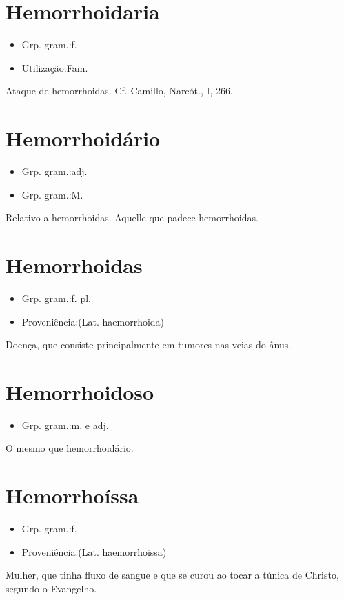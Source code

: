 \documentclass{article}
\begin{document}
\section{Hemorrhoidaria}
\begin{itemize}
\item {Grp. gram.:f.}
\end{itemize}
\begin{itemize}
\item {Utilização:Fam.}
\end{itemize}
Ataque de hemorrhoidas. Cf. Camillo, \textunderscore Narcót.\textunderscore , I, 266.
\section{Hemorrhoidário}
\begin{itemize}
\item {Grp. gram.:adj.}
\end{itemize}
\begin{itemize}
\item {Grp. gram.:M.}
\end{itemize}
Relativo a hemorrhoidas.
Aquelle que padece hemorrhoidas.
\section{Hemorrhoidas}
\begin{itemize}
\item {Grp. gram.:f. pl.}
\end{itemize}
\begin{itemize}
\item {Proveniência:(Lat. \textunderscore haemorrhoida\textunderscore )}
\end{itemize}
Doença, que consiste principalmente em tumores nas veias do ânus.
\section{Hemorrhoidoso}
\begin{itemize}
\item {Grp. gram.:m. e adj.}
\end{itemize}
O mesmo que \textunderscore hemorrhoidário\textunderscore .
\section{Hemorrhoíssa}
\begin{itemize}
\item {Grp. gram.:f.}
\end{itemize}
\begin{itemize}
\item {Proveniência:(Lat. \textunderscore haemorrhoissa\textunderscore )}
\end{itemize}
Mulher, que tinha fluxo de sangue e que se curou ao tocar a túnica de Christo, segundo o \textunderscore Evangelho\textunderscore .
\end{document}
